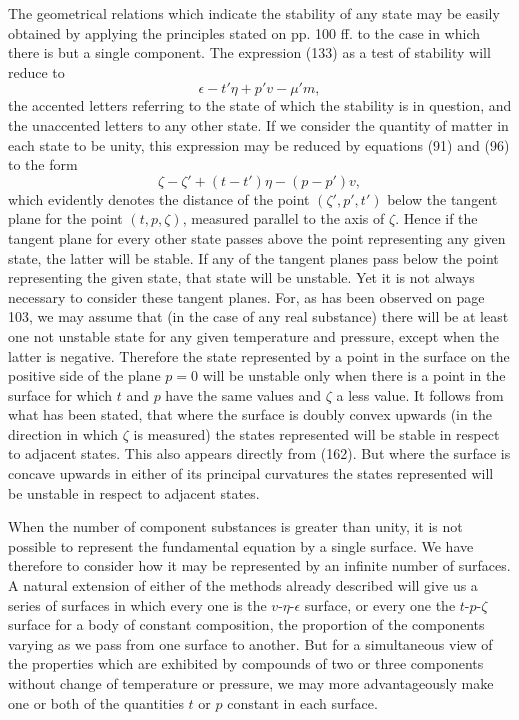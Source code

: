 \documentclass[11pt]{article}
\newcommand{\eps}{\epsilon}
\begin{document}
The geometrical relations which indicate the stability of any state may be easily obtained by applying the principles stated on pp. 100 ff. to the case in which there is but a single component. The expression (133) as a test of stability will reduce to
\begin{equation}\label{eq:gibbs-v1-p3-197}
\eps-t'\eta+p'v-\mu'm, \tag{197}
\end{equation}
the accented letters referring to the state of which the stability is in question, and the unaccented letters to any other state. If we consider the quantity of matter in each state to be unity, this expression may be reduced by equations (91) and (96) to the form
\begin{equation}\label{eq:gibbs-v1-p3-198}
\zeta-\zeta'+(t-t')\eta-(p-p')v, \tag{198}
\end{equation}
which evidently denotes the distance of the point $(\zeta',p',t')$ below the tangent plane for the point $(t,p,\zeta)$, measured parallel to the axis of $\zeta$. Hence if the tangent plane for every other state passes above the point representing any given state, the latter will be stable. If any of the tangent planes pass below the point representing the given state, that state will be unstable. Yet it is not always necessary to consider these tangent planes. For, as has been observed on page 103, we may assume that (in the case of any real substance) there will be at least one not unstable state for any given temperature and pressure, except when the latter is negative. Therefore the state represented by a point in the surface on the positive side of the plane $p=0$ will be unstable only when there is a point in the surface for which $t$ and $p$ have the same values and $\zeta$ a less value. It follows from what has been stated, that where the surface is doubly convex upwards (in the direction in which $\zeta$ is measured) the states represented will be stable in respect to adjacent states. This also appears directly from (162). But where the surface is concave upwards in either of its principal curvatures the states represented will be unstable in respect to adjacent states.

When the number of component substances is greater than unity, it is not possible to represent the fundamental equation by a single surface. We have therefore to consider how it may be represented by an infinite number of surfaces. A natural extension of either of the methods already described will give us a series of surfaces in which every one is the $v$-$\eta$-$\eps$ surface, or every one the $t$-$p$-$\zeta$ surface for a body of constant composition, the proportion of the components varying as we pass from one surface to another. But for a simultaneous view of the properties which are exhibited by compounds of two or three components without change of temperature or pressure, we may more advantageously make one or both of the quantities $t$ or $p$ constant in each surface.
\end{document}
